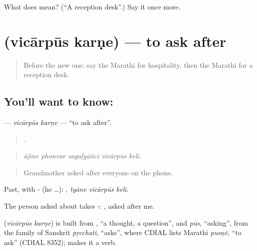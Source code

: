 \begin{tcolorbox}[breakable,colback=teal!4,colframe=teal!35!black,title={Before you move on}]
What does  mean? (\textquotedblleft{}A reception desk\textquotedblright{}.) Say it once more.
\end{tcolorbox}
\section[\texorpdfstring{\mr{विचारपूस} \mr{करणे} (vicārpūs karṇe)}{विचारपूस करणे (vicārpūs karṇe)}]{  (vicārpūs karṇe) — to ask after}

\label{lesson:MR-C414-vicarpus-karne}



\begin{quote}
Before the new one: say the Marathi for hospitality, then the Marathi for a reception desk.
\end{quote}

\subsection*{You'll want to know:  }
\textbf{ } — \emph{vicārpūs karṇe} — \textquotedblleft{}to ask after\textquotedblright{}.

\begin{quote}
    .
\end{quote}

\begin{quote}
\emph{ājīne phonvar sagaḷyāñcī vicārpūs kelī.}
\end{quote}

\begin{quote}
Grandmother asked after everyone on the phone.
\end{quote}

Past, with - (he …):   , \emph{tyāne vicārpūs kelī}.

The person asked about takes -:   , asked after me.

\begin{cousinweb}
\textbf{ } (\emph{vicārpūs karṇe}) is built from \textbf{}, \textquotedblleft{}a thought, a question\textquotedblright{}, and \emph{pūs}, \textquotedblleft{}asking\textquotedblright{}, from the family of Sanskrit \emph{pṛcchati}, \textquotedblleft{}asks\textquotedblright{}, where CDIAL lists Marathi \emph{pusṇẽ}, \textquotedblleft{}to ask\textquotedblright{} (CDIAL 8352); \textbf{} makes it a verb.
\end{cousinweb}

